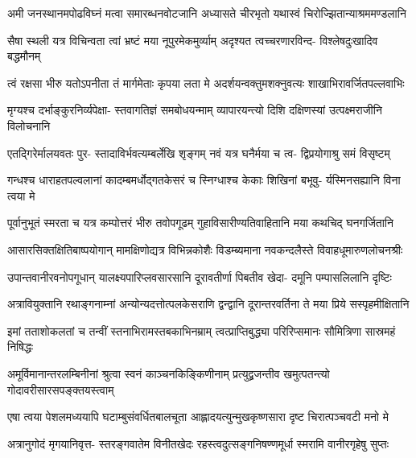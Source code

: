 \fourlineindentedshloka
{अमी जनस्थानमपोढविघ्नं}
{मत्वा समारब्धनवोटजानि}
{अध्यासते चीरभृतो यथास्वं}
{चिरोज्झितान्याश्रममण्डलानि} %

\fourlineindentedshloka
{सैषा स्थली यत्र विचिन्वता त्वां}
{भ्रष्टं मया नूपुरमेकमुर्व्याम्}
{अदृश्यत त्वच्चरणारविन्द-}
{विश्लेषदुःखादिव बद्धमौनम्} %

\fourlineindentedshloka
{त्वं रक्षसा भीरु यतोऽपनीता}
{तं मार्गमेताः कृपया लता मे}
{अदर्शयन्वक्तुमशक्नुवत्यः}
{शाखाभिरावर्जितपल्लवाभिः} %

\fourlineindentedshloka
{मृग्यश्च दर्भाङ्कुरनिर्व्यपेक्षा-}
{स्तवागतिज्ञं समबोधयन्माम्}
{व्यापारयन्त्यो दिशि दक्षिणस्यां}
{उत्पक्ष्मराजीनि विलोचनानि} %

\fourlineindentedshloka
{एतद्गिरेर्मालयवतः पुर-}
{स्तादाविर्भवत्यम्बर्लेखि शृङ्गम्}
{नवं यत्र घनैर्मया च त्व-}
{द्विप्रयोगाश्रु समं विसृष्टम्} %

\fourlineindentedshloka
{गन्धश्च धाराहतपल्वलानां}
{कादम्बमर्धोद्गतकेसरं च}
{स्निग्धाश्च केकाः शिखिनां बभूवु-}
{र्यस्मिनसह्यानि विना त्वया मे} %

\fourlineindentedshloka
{पूर्वानुभूतं स्मरता च यत्र}
{कम्पोत्तरं भीरु तवोपगूढम्}
{गुहाविसारीण्यतिवाहितानि}
{मया कथचिद् घनगर्जितानि} %

\fourlineindentedshloka
{आसारसिक्तक्षितिबाष्पयोगान्}
{मामक्षिणोद्यत्र विभिन्नकोशैः}
{विडम्ब्यमाना नवकन्दलैस्ते}
{विवाहधूमारुणलोचनश्रीः} %

\fourlineindentedshloka
{उपान्तवानीरवनोपगूधान्}
{यालक्ष्यपारिप्लवसारसानि}
{दूरावतीर्णा पिबतीव खेदा-}
{दमूनि पम्पासलिलानि दृष्टिः} %

\fourlineindentedshloka
{अत्रावियुक्तानि रथाङ्गनाम्नां}
{अन्योन्यदत्तोत्पलकेसराणि}
{द्वन्द्वानि दूरान्तरवर्तिना ते}
{मया प्रिये सस्पृहमीक्षितानि} %

\fourlineindentedshloka
{इमां तताशोकलतां च तन्वीं}
{स्तनाभिरामस्तबकाभिनम्राम्}
{त्वत्प्राप्तिबुद्ध्या परिरिप्समानः}
{सौमित्रिणा सास्रमहं निषिद्धः} %

\fourlineindentedshloka
{अमूर्विमानान्तरलम्बिनीनां}
{श्रुत्वा स्वनं काञ्चनकिङ्किणीनाम्}
{प्रत्युद्व्रजन्तीव खमुत्पतन्त्यो}
{गोदावरीसारसपङ्क्तयस्त्वाम्} %

\fourlineindentedshloka
{एषा त्वया पेशलमध्ययापि}
{घटाम्बुसंवर्धितबालचूता}
{आह्लादयत्युन्मुखकृष्णसारा}
{दृष्ट चिरात्पञ्चवटी मनो मे} %

\fourlineindentedshloka
{अत्रानुगोदं मृगयानिवृत्त-}
{स्तरङ्गवातेम विनीतखेदः}
{रहस्त्वदुत्सङ्गनिषण्णमूर्धा}
{स्मरामि वानीरगृहेषु सुप्तः} %


